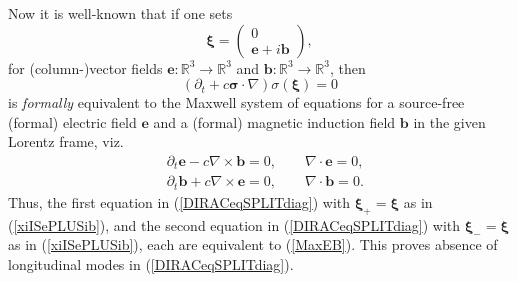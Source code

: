 \documentclass[12pt]{article}
\theoremstyle{definition}
\numberwithin{equation}{section}
\newcommand{\bb}{\mathbf{b}}
\newcommand{\be}{\mathbf{e}}
\newcommand{\beq}{\begin{equation}}
\newcommand{\eeq}{\end{equation}}
\newcommand{\p}{\partial}
\newcommand{\siV}{\boldsymbol{\sigma}}
\newcommand{\xiV}{{\boldsymbol{\xi}}}
\newcommand{\Rset}{{\mathbb R}}
\newcommand{\si}{\sigma}
\newcommand{\nab}{\nabla}
\begin{document}
 Now it is well-known \cite{LapUhl1931,OppiPHOTON,IBBphotonREV} that if one sets 
\beq \label{xiISePLUSib}
\xiV = \begin{pmatrix} 0 \\  \be + i \bb \end{pmatrix},
\eeq
for (column-)vector fields $\be:\Rset^3\to\Rset^3$ and $\bb:\Rset^3\to\Rset^3$, then 
\vspace{-5pt}
\beq \label{eq:Weyl}
(\p_t + c\siV\cdot\nab) \si(\xiV) = 0
\eeq
is \emph{formally} equivalent to the Maxwell system of equations for a source-free (formal) electric field $\be$ and a (formal) 
magnetic induction field $\bb$ in the given Lorentz frame, viz.
\beq \label{MaxEB}
\begin{array}{ll}
&\p_t\be - c\nab\times\bb = 0, \qquad \nab\cdot \be = 0,\\
&\p_t\bb + c\nab\times\be = 0, \qquad \nab\cdot \bb = 0.
\end{array}
\eeq
 Thus, the first equation in (\ref{DIRACeqSPLITdiag}) with $\xiV_+ = \xiV$ as in (\ref{xiISePLUSib}), and the second equation
in (\ref{DIRACeqSPLITdiag}) with $\xiV_- =\xiV$ as in (\ref{xiISePLUSib}), each are equivalent to (\ref{MaxEB}).
 This proves absence of longitudinal modes in (\ref{DIRACeqSPLITdiag}).
\end{document}
